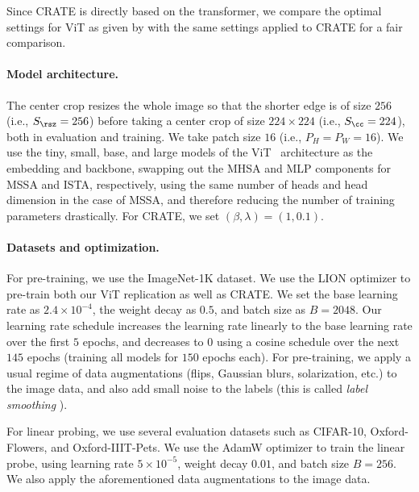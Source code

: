 \documentclass[../../book-main.tex]{subfiles}
\begin{document}
Since CRATE is directly based on the transformer, we compare the
optimal settings for ViT as given by
\citep{dosovitskiy2020image,touvron2020training} with the same
settings applied to CRATE for a fair comparison.

\paragraph{Model architecture.} The center crop resizes the whole
image so that the shorter edge is of size \(256\) (i.e., \(S_{\rsz} =
256\)) before taking a center crop of size \(224 \times 224\) (i.e.,
\(S_{\cc} = 224\)), both in evaluation and training. We take patch
size \(16\) (i.e., \(P_{H} = P_{W} = 16\)). We use the tiny, small,
base, and large models of the ViT~\citep{dosovitskiy2020image}
architecture as the embedding and backbone, swapping out the MHSA and
MLP components for MSSA and ISTA, respectively, using the same number
of heads and head dimension in the case of MSSA, and therefore
reducing the number of training parameters drastically. For CRATE, we
set \((\beta, \lambda) = (1, 0.1)\).

\paragraph{Datasets and optimization.} For pre-training, we use the
ImageNet-1K dataset. We use the LION optimizer
\citep{chen2024symbolic} to pre-train both our ViT replication as
well as CRATE. We set the base learning rate as \(2.4 \times
10^{-4}\), the weight decay as \(0.5\), and batch size as \(B =
2048\). Our learning rate schedule increases the learning rate
linearly to the base learning rate over the first \(5\) epochs, and
decreases to \(0\) using a cosine schedule over the next \(145\)
epochs (training all models for \(150\) epochs each). For
pre-training, we apply a usual regime of data augmentations (flips,
Gaussian blurs, solarization, etc.) to the image data, and also add
small noise to the labels (this is called \textit{label smoothing}
\citep{muller2019does}).

For linear probing, we use several evaluation datasets such as
CIFAR-10, Oxford-Flowers, and Oxford-IIIT-Pets. We use the AdamW
optimizer to train the linear probe, using learning rate \(5 \times
10^{-5}\), weight decay \(0.01\), and batch size \(B = 256\). We also
apply the aforementioned data augmentations to the image data.
\end{document}
